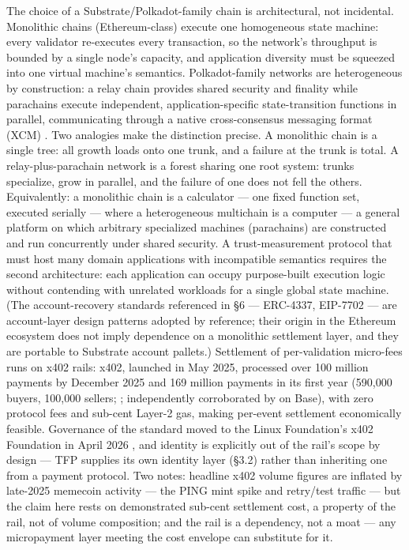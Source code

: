 \documentclass[11pt,twocolumn]{article}
\begin{document}
The choice of a Substrate/Polkadot-family chain is architectural, not
incidental. Monolithic chains (Ethereum-class) execute one homogeneous
state machine: every validator re-executes every transaction, so the
network's throughput is bounded by a single node's capacity, and
application diversity must be squeezed into one virtual machine's
semantics. Polkadot-family networks are heterogeneous by construction: a
relay chain provides shared security and finality while parachains
execute independent, application-specific state-transition functions in
parallel, communicating through a native cross-consensus messaging
format (XCM) \citep{polkadotdocs2026}. Two analogies make the
distinction precise. A monolithic chain is a single tree: all growth
loads onto one trunk, and a failure at the trunk is total. A
relay-plus-parachain network is a forest sharing one root system: trunks
specialize, grow in parallel, and the failure of one does not fell the
others. Equivalently: a monolithic chain is a calculator --- one fixed
function set, executed serially --- where a heterogeneous multichain is
a computer --- a general platform on which arbitrary specialized
machines (parachains) are constructed and run concurrently under shared
security. A trust-measurement protocol that must host many domain
applications with incompatible semantics requires the second
architecture: each application can occupy purpose-built execution logic
without contending with unrelated workloads for a single global state
machine. (The account-recovery standards referenced in §6 --- ERC-4337,
EIP-7702 --- are account-layer design patterns adopted by reference;
their origin in the Ethereum ecosystem does not imply dependence on a
monolithic settlement layer, and they are portable to Substrate account
pallets.) Settlement of per-validation micro-fees runs on x402 rails:
x402, launched in May 2025, processed over 100
million payments by December 2025 and 169 million payments in its first
year (590,000 buyers, 100,000 sellers; \citealp{x402foundation2026};
independently corroborated by \citealp{chainalysis2026} on Base), with
zero protocol fees and sub-cent Layer-2 gas, making per-event settlement
economically feasible. Governance of the standard moved to the Linux
Foundation's x402 Foundation in April 2026 \citep{x402foundation2026},
and identity is explicitly out of the rail's scope by design --- TFP
supplies its own identity layer (§3.2) rather than inheriting one from a
payment protocol. Two notes: headline x402 volume figures are
inflated by late-2025 memecoin activity --- the PING mint spike and
retry/test traffic \citep{chainalysis2026} --- but the claim here rests
on demonstrated sub-cent settlement cost, a property of the rail, not of
volume composition; and the rail is a dependency, not a moat --- any
micropayment layer meeting the cost envelope can substitute for it.
\end{document}
